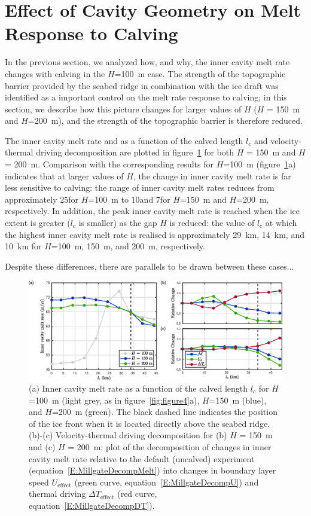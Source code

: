 \documentclass[draft]{agujournal2019}
\begin{document}
\section{Effect of Cavity Geometry on Melt Response to Calving}\label{S:Results:H}
In the previous section, we analyzed how, and why, the inner cavity melt rate changes with calving in the $H$=100~m case. The strength of the topographic barrier provided by the seabed ridge in combination with the ice draft was identified as a important control on the melt rate response to calving; in this section, we describe how this picture changes for larger values of $H$ ($H$ = 150~m and $H$=200~m), and the strength of the topographic barrier is therefore reduced.

The inner cavity melt rate and as a function of the calved length $l_c$ and velocity-thermal driving decomposition are plotted in figure~\ref{fig:figure6} for both $H$ = 150~m and $H$ = 200~m. Comparison with the corresponding results for $H$=100~m (figure~\ref{fig:figure6}a) indicates that at larger values of $H$, the change in inner cavity melt rate is far less sensitive to calving: the range of inner cavity melt rates reduces from approximately 25\mpryr for $H$=100~m to 10\mpryr and 7\mpryr for $H$=150~m and $H$=200~m, respectively. In addition, the peak inner cavity melt rate is reached when the ice extent is greater ($l_c$ is smaller) as the gap $H$ is reduced: the value of $l_c$ at which the highest inner cavity melt rate is realised is approximately 29~km, 14~km, and 10~km for $H$=100~m, 150~m, and 200~m, respectively.

Despite these differences, there are parallels to be drawn between these cases...

\begin{figure}
    \centering
    \includegraphics[width = \textwidth]{../make_figures/plots/figure6.eps}
    \caption{(a) Inner cavity melt rate as a function of the calved length $l_c$ for $H$=100~m (light grey, as in figure~\ref{fig:figure4}a), $H$=150~m (blue), and $H$=200~m (green). The black dashed line indicates the position of the ice front when it is located directly above the seabed ridge. (b)-(c) Velocity-thermal driving decomposition for (b) $H$ = 150~m and (c) $H$ = 200~m: plot of the decomposition of changes in inner cavity melt rate relative to the default (uncalved) experiment (equation~\eqref{E:MillgateDecompMelt}) into changes in boundary layer speed $U_\text{effect}$ (green curve, equation~\eqref{E:MillgateDecompU}) and thermal driving $\Delta T_{\text{effect}}$ (red curve, equation~\eqref{E:MillgateDecompDT}).}
    \label{fig:figure6}
\end{figure}
\end{document}
